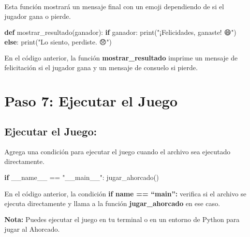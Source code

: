 \documentclass[
  a4paper,
  DIV=11,
  numbers=noendperiod,
  onepage,
  openany]{scrreprt}
\newenvironment{Shaded}{\begin{snugshade}}{\end{snugshade}}
\newcommand{\BuiltInTok}[1]{\textcolor[rgb]{0.00,0.23,0.31}{#1}}
\newcommand{\ControlFlowTok}[1]{\textcolor[rgb]{0.00,0.23,0.31}{\textbf{#1}}}
\newcommand{\KeywordTok}[1]{\textcolor[rgb]{0.00,0.23,0.31}{\textbf{#1}}}
\newcommand{\NormalTok}[1]{\textcolor[rgb]{0.00,0.23,0.31}{#1}}
\newcommand{\OperatorTok}[1]{\textcolor[rgb]{0.37,0.37,0.37}{#1}}
\newcommand{\StringTok}[1]{\textcolor[rgb]{0.13,0.47,0.30}{#1}}
\newcommand{\VariableTok}[1]{\textcolor[rgb]{0.07,0.07,0.07}{#1}}
\begin{document}
Esta función mostrará un mensaje final con un emoji dependiendo de si el
jugador gana o pierde.

\begin{Shaded}
\begin{Highlighting}[]
\KeywordTok{def}\NormalTok{ mostrar\_resultado(ganador):}
    \ControlFlowTok{if}\NormalTok{ ganador:}
        \BuiltInTok{print}\NormalTok{(}\StringTok{"¡Felicidades, ganaste! 😄"}\NormalTok{)}
    \ControlFlowTok{else}\NormalTok{:}
        \BuiltInTok{print}\NormalTok{(}\StringTok{"Lo siento, perdiste. 😞"}\NormalTok{)}
\end{Highlighting}
\end{Shaded}

En el código anterior, la función \textbf{mostrar\_resultado} imprime un
mensaje de felicitación si el jugador gana y un mensaje de consuelo si
pierde.

\section{Paso 7: Ejecutar el Juego}\label{paso-7-ejecutar-el-juego}

\subsection{Ejecutar el Juego:}\label{ejecutar-el-juego}

Agrega una condición para ejecutar el juego cuando el archivo sea
ejecutado directamente.

\begin{Shaded}
\begin{Highlighting}[]
\ControlFlowTok{if} \VariableTok{\_\_name\_\_} \OperatorTok{==} \StringTok{"\_\_main\_\_"}\NormalTok{:}
\NormalTok{    jugar\_ahorcado()}
\end{Highlighting}
\end{Shaded}

En el código anterior, la condición \textbf{if \textbf{name} ==
``\textbf{main}'':} verifica si el archivo se ejecuta directamente y
llama a la función \textbf{jugar\_ahorcado} en ese caso.

\begin{tcolorbox}[enhanced jigsaw, breakable, colframe=quarto-callout-tip-color-frame, toprule=.15mm, left=2mm, leftrule=.75mm, opacityback=0, coltitle=black, opacitybacktitle=0.6, bottomtitle=1mm, colback=white, bottomrule=.15mm, title=\textcolor{quarto-callout-tip-color}{\faLightbulb}\hspace{0.5em}{Tip}, rightrule=.15mm, colbacktitle=quarto-callout-tip-color!10!white, titlerule=0mm, arc=.35mm, toptitle=1mm]

\textbf{Nota:} Puedes ejecutar el juego en tu terminal o en un entorno
de Python para jugar al Ahorcado.

\end{tcolorbox}
\end{document}
